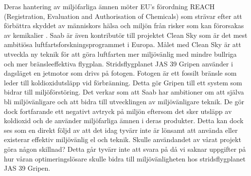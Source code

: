 \newline
\newline 
Deras hantering av miljöfarliga ämnen möter EU's förordning REACH (Registration, Evaluation and Authorisation of Chemicals) som strävar efter att förbättra skyddet av människors hälsa och miljön från risker som kan förorsakas av kemikalier \citep{reach}. 
Saab är även kontributör till projektet Clean Sky som är det mest ambitiösa luftfartsforskningsprogrammet i Europa. Målet med Clean Sky är att utveckla ny teknik för att göra luftfarten mer miljövänlig med mindre bullriga och mer bränsleeffektiva flygplan. \citep{cleansky}     
\newline
\newline
Stridsflygplanet JAS 39 Gripen använder i dagsläget en jetmotor som drivs på fotogen. Fotogen är ett fossilt bränsle som leder till koldioxidutsläpp vid förbränning. Detta gör Gripen till ett system som bidrar till miljöförstöring. 
\newline
\newline
Det verkar som att Saab har ambitioner om att själva bli miljövänligare och att bidra till utvecklingen av miljövänligare teknik. De gör dock fortfarande ett negativt avtryck på miljön eftersom det sker utsläpp av koldioxid och de använder miljöfarliga ämnen i deras produkter. Detta kan dock ses som en direkt följd av att det idag tyvärr inte är lönsamt att använda eller existerar effektiv miljövänlig el och teknik.  
\newline
\newline
Skulle användandet av vårat projekt göra någon skillnad? Detta går tyvärr inte att svara på då vi saknar uppgifter på hur våran optimeringslösare skulle bidra till miljövänligheten hos stridsflygplanet JAS 39 Gripen.        